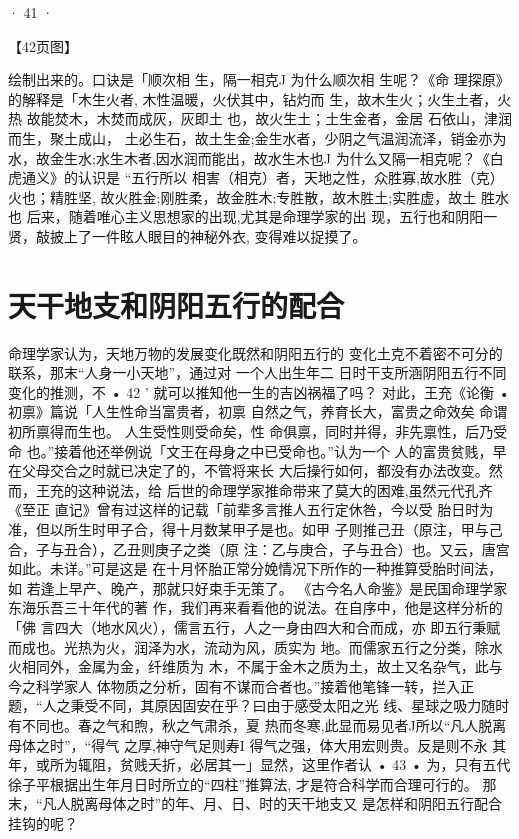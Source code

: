 · 41 ·

【42页图】

绘制出来的。口诀是「顺次相
生，隔一相克J
为什么顺次相 生呢？《命
理探原》的解释是「木生火者,
木性温暖，火伏其中，钻灼而
生，故木生火；火生土者，火热
故能焚木，木焚而成灰，灰即土
也，故火生土；土生金者，金居
石依山，津润而生，聚土成山，
土必生石，故土生金;金生水者，少阴之气温润流泽，销金亦为
水，故金生水;水生木者,因水润而能出，故水生木也J
为什么又隔一相克呢？《白虎通义》的认识是 “五行所以
相害（相克）者，天地之性，众胜寡,故水胜（克）火也；精胜坚,
故火胜金;刚胜柔，故金胜木;专胜散，故木胜土;实胜虚，故土
胜水也
后来，随着唯心主义思想家的出现,尤其是命理学家的出
现，五行也和阴阳一贤，敲披上了一件眩人眼目的神秘外衣,
变得难以捉摸了。

\section{天干地支和阴阳五行的配合}

命理学家认为，天地万物的发展变化既然和阴阳五行的
变化土克不着密不可分的联系，那末“人身一小天地”，通过对
一个人出生年二 日时干支所涵阴阳五行不同变化的推测，不
• 42 '
就可以推知他一生的吉凶祸福了吗？
对此，王充《论衡 • 初禀》篇说「人生性命当富贵者，初禀
自然之气，养育长大，富贵之命效矣 命谓初所禀得而生也。
人生受性则受命矣，性 命俱禀，同时并得，非先禀性，后乃受命
也。”接着他还举例说「文王在母身之中已受命也。”认为一个
人的富贵贫贱，早在父母交合之时就已决定了的，不管将来长
大后操行如何，都没有办法改变。然而，王充的这种说法，给
后世的命理学家推命带来了莫大的困难,虽然元代孔齐《至正
直记》曾有过这样的记载「前辈多言推人五行定休咎，今以受
胎日时为准，但以所生时甲子合，得十月数某甲子是也。如甲
子则推己丑（原注，甲与己合，子与丑合），乙丑则庚子之类（原
注：乙与庚合，子与丑合）也。又云，唐宫如此。未详。”可是这是
在十月怀胎正常分娩情况下所作的一种推算受胎时间法，如
若逢上早产、晚产，那就只好束手无策了。
《古今名人命鉴》是民国命理学家东海乐吾三十年代的著
作，我们再来看看他的说法。在自序中，他是这样分析的「佛
言四大（地水风火），儒言五行，人之一身由四大和合而成，亦
即五行秉赋而成也。光热为火，润泽为水，流动为风，质实为
地。而儒家五行之分类，除水火相同外，金属为金，纤维质为
木，不属于金木之质为土，故土又名杂气，此与今之科学家人
体物质之分析，固有不谋而合者也。”接着他笔锋一转，拦入正
题，“人之秉受不同，其原因固安在乎？曰由于感受太阳之光
线、星球之吸力随时有不同也。春之气和煦，秋之气肃杀，夏
热而冬寒,此显而易见者J所以“凡人脱离母体之时”，“得气
之厚,神守气足则寿I 得气之强，体大用宏则贵。反是则不永
其年，或所为辄阻，贫贱夭折，必居其一」显然，这里作者认
• 43 •
为，只有五代徐子平根据出生年月日时所立的“四柱”推算法,
才是符合科学而合理可行的。
那末，“凡人脱离母体之时”的年、月、日、时的天干地支又
是怎样和阴阳五行配合挂钩的呢？

